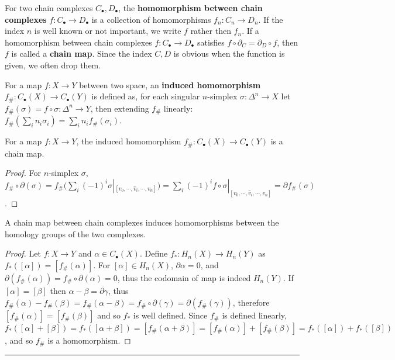 \begin{defn} For two chain complexes $C_\bullet,D_\bullet$, the \textbf{homomorphism between chain complexes} $f:C_\bullet\rightarrow D_\bullet$ is a collection of homomorphisms $f_n:C_n\rightarrow D_n$. If the index $n$ is well known or not important, we write $f$ rather then $f_n$. If a homomorphism between chain complexes $f:C_\bullet\rightarrow D_\bullet$ satisfies $f\circ \partial_C=\partial_D\circ f$, then $f$ is called a \textbf{chain map}. Since the index $C,D$ is obvious when the function is given, we often drop them.
\end{defn}
\begin{defn} For a map $f:X\rightarrow Y$ between two space, an \textbf{induced homomorphism} $f_\#:C_\bullet(X)\rightarrow C_\bullet(Y)$ is defined as, for each singular $n$-simplex $\sigma:\Delta^n\rightarrow X$ let $f_\#(\sigma)=f\circ \sigma:\Delta^n\rightarrow Y$, then extending $f_\#$ linearly: $f_\#(\sum_i n_i\sigma_i)=\sum_i n_i f_\#(\sigma_i)$.
\end{defn}

\begin{prop} For a map $f:X\rightarrow Y$, the induced homomorphism $f_\#:C_\bullet(X)\rightarrow C_\bullet(Y)$ is a chain map.
\end{prop}
\begin{proof}
For $n$-simplex $\sigma$, $f_\#\circ \partial(\sigma)=f_\#(\sum_i (-1)^i \sigma|_{[v_0,\cdots,\hat{v}_i,\cdots,v_n]})=\sum_i (-1)^i f\circ \sigma|_{[v_0,\cdots,\hat{v}_i,\cdots,v_n]}=\partial f_\#(\sigma)$.
\end{proof}

\begin{prop} A chain map between chain complexes induces homomorphisms between the homology groups of the two complexes.
\end{prop}
\begin{proof}
Let $f:X\rightarrow Y$ and $\alpha\in C_\bullet(X)$. Define $f_*:H_n(X)\rightarrow H_n(Y)$ as $f_*([\alpha])=[f_\#(\alpha)]$. For $[\alpha]\in H_n(X)$, $\partial \alpha=0$, and $\partial(f_\#(\alpha))=f_\#\circ \partial(\alpha)=0$, thus the codomain of map is indeed $H_n(Y)$. If $[\alpha]=[\beta]$ then $\alpha-\beta=\partial \gamma$, thus $f_\#(\alpha)-f_\#(\beta)=f_\#(\alpha-\beta)=f_\#\circ \partial(\gamma)=\partial(f_\#(\gamma))$, therefore $[f_\#(\alpha)]=[f_\#(\beta)]$ and so $f_*$ is well defined. Since $f_\#$ is defined linearly, $f_*([\alpha]+[\beta])=f_*([\alpha+\beta])=[f_\#(\alpha+\beta)]=[f_\#(\alpha)]+[f_\#(\beta)]=f_*([\alpha])+f_*([\beta])$, and so $f_\#$ is a homomorphism.
\end{proof}
\noindent\rule{\textwidth}{1pt}
\newline